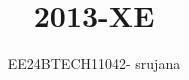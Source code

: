 \documentclass[journal]{IEEEtran}
\begin{document}

\vspace{3cm}

\title{2013-XE}
\author{EE24BTECH11042- srujana}
{\let\newpage\relax\maketitle}

\renewcommand{\thefigure}{\theenumi}
\renewcommand{\thetable}{\theenumi}
\setlength{\intextsep}{10pt} %


\renewcommand{\thetable}{\theenumi}
\end{document}
